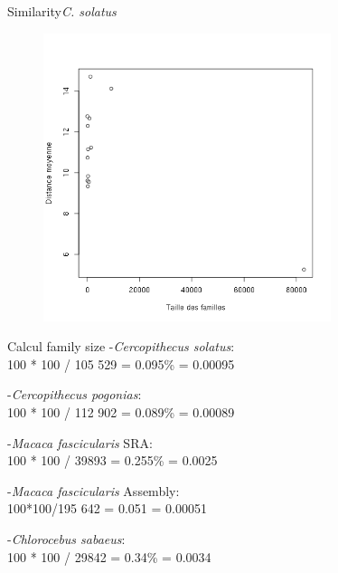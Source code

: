 \documentclass[11pt]{beamer}
\begin{document}
\begin{frame}{Similarity}{\textit{C. solatus}}
\begin{center}
	\begin{figure}
		\includegraphics[width=0.75\textwidth]{img/Cso_similarity_090.png}
	\end{figure}	
\end{center}
\end{frame}
\begin{frame}{Calcul family size}
-\textit{Cercopithecus solatus}: \\
100 * 100 / 105 529 = 0.095\% = 0.00095\medbreak 

-\textit{Cercopithecus pogonias}:\\
100 * 100 / 112 902 = 0.089\% = 0.00089\medbreak 

-\textit{Macaca fascicularis} SRA:\\
100 * 100 / 39893 = 0.255\% = 0.0025\medbreak 

-\textit{Macaca fascicularis} Assembly:\\
100*100/195 642 = 0.051 = 0.00051\medbreak 

-\textit{Chlorocebus sabaeus}:\\
100 * 100 / 29842 = 0.34\% = 0.0034
\end{frame}
\end{document}
